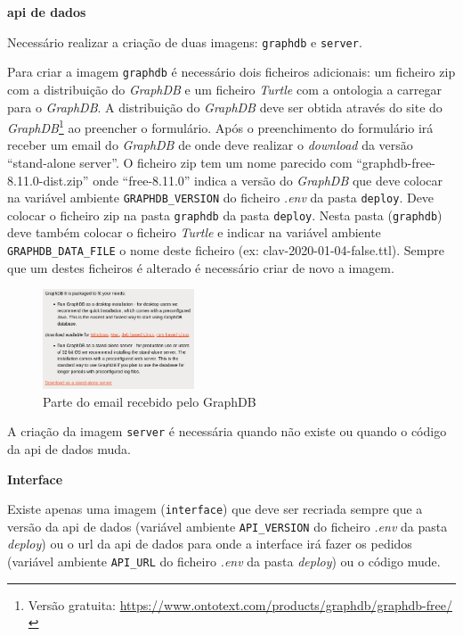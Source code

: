 \begin{description}
    \item \textbf{\acrshort{api} de dados}

    Necessário realizar a criação de duas imagens: \texttt{graphdb} e \texttt{server}.

    Para criar a imagem \texttt{graphdb} é necessário dois ficheiros adicionais: um ficheiro zip com a distribuição do \textit{GraphDB} e um ficheiro \textit{Turtle} com a ontologia a carregar para o \textit{GraphDB}. A distribuição do \textit{GraphDB} deve ser obtida através do site do \textit{GraphDB}\footnote{Versão gratuita: \url{https://www.ontotext.com/products/graphdb/graphdb-free/}} ao preencher o formulário. Após o preenchimento do formulário irá receber um email do \textit{GraphDB} de onde deve realizar o \textit{download} da versão ``stand-alone server''. O ficheiro zip tem um nome parecido com ``graphdb-free-8.11.0-dist.zip'' onde ``free-8.11.0'' indica a versão do \textit{GraphDB} que deve colocar na variável ambiente \texttt{GRAPHDB\_VERSION} do ficheiro \textit{.env} da pasta \texttt{deploy}. Deve colocar o ficheiro zip na pasta \texttt{graphdb} da pasta \texttt{deploy}. Nesta pasta (\texttt{graphdb}) deve também colocar o ficheiro \textit{Turtle} e indicar na variável ambiente \texttt{GRAPHDB\_DATA\_FILE} o nome deste ficheiro (ex: clav-2020-01-04-false.ttl). Sempre que um destes ficheiros é alterado é necessário criar de novo a imagem.

    \begin{figure}[H]
        \centering
        \includegraphics[width=0.4\textwidth]{img/graphdb_email.png}
        \caption{Parte do email recebido pelo GraphDB\label{fig:instalacao-email}}
    \end{figure}

    A criação da imagem \texttt{server} é necessária quando não existe ou quando o código da \acrshort{api} de dados muda.

    \item \textbf{Interface}

    Existe apenas uma imagem (\texttt{interface}) que deve ser recriada sempre que a versão da \acrshort{api} de dados (variável ambiente \texttt{API\_VERSION} do ficheiro \textit{.env} da pasta \textit{deploy}) ou o \acrshort{url} da \acrshort{api} de dados para onde a interface irá fazer os pedidos (variável ambiente \texttt{API\_URL} do ficheiro \textit{.env} da pasta \textit{deploy}) ou o código mude.
\end{description}

